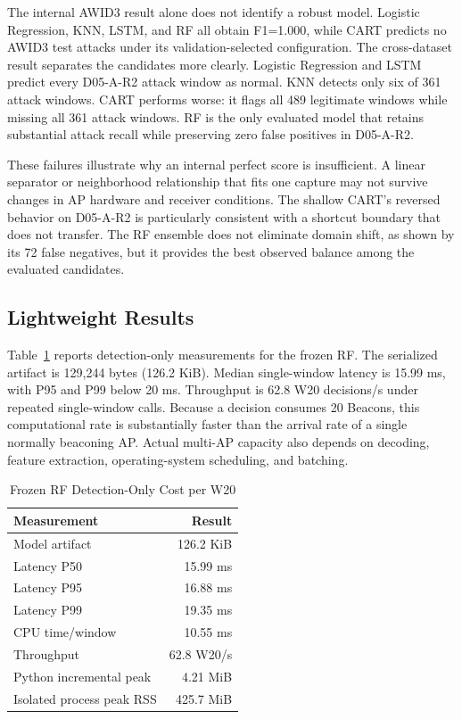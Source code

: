 \documentclass[conference]{IEEEtran}
\begin{document}
The internal AWID3 result alone does not identify a robust model. Logistic Regression, KNN, LSTM, and RF all obtain F1=1.000, while CART predicts no AWID3 test attacks under its validation-selected configuration. The cross-dataset result separates the candidates more clearly. Logistic Regression and LSTM predict every D05-A-R2 attack window as normal. KNN detects only six of 361 attack windows. CART performs worse: it flags all 489 legitimate windows while missing all 361 attack windows. RF is the only evaluated model that retains substantial attack recall while preserving zero false positives in D05-A-R2.

These failures illustrate why an internal perfect score is insufficient. A linear separator or neighborhood relationship that fits one capture may not survive changes in AP hardware and receiver conditions. The shallow CART's reversed behavior on D05-A-R2 is particularly consistent with a shortcut boundary that does not transfer. The RF ensemble does not eliminate domain shift, as shown by its 72 false negatives, but it provides the best observed balance among the evaluated candidates.

\subsection{Lightweight Results}

Table~\ref{tab:lightweight} reports detection-only measurements for the frozen RF. The serialized artifact is 129,244 bytes (126.2 KiB). Median single-window latency is 15.99 ms, with P95 and P99 below 20 ms. Throughput is 62.8 W20 decisions/s under repeated single-window calls. Because a decision consumes 20 Beacons, this computational rate is substantially faster than the arrival rate of a single normally beaconing AP. Actual multi-AP capacity also depends on decoding, feature extraction, operating-system scheduling, and batching.

\begin{table}[t]
\caption{Frozen RF Detection-Only Cost per W20}
\label{tab:lightweight}
\centering
\footnotesize
\begin{tabular}{@{}lr@{}}
\toprule
\textbf{Measurement} & \textbf{Result}\\
\midrule
Model artifact & 126.2 KiB\\
Latency P50 & 15.99 ms\\
Latency P95 & 16.88 ms\\
Latency P99 & 19.35 ms\\
CPU time/window & 10.55 ms\\
Throughput & 62.8 W20/s\\
Python incremental peak & 4.21 MiB\\
Isolated process peak RSS & 425.7 MiB\\
\bottomrule
\end{tabular}
\end{table}
\end{document}
